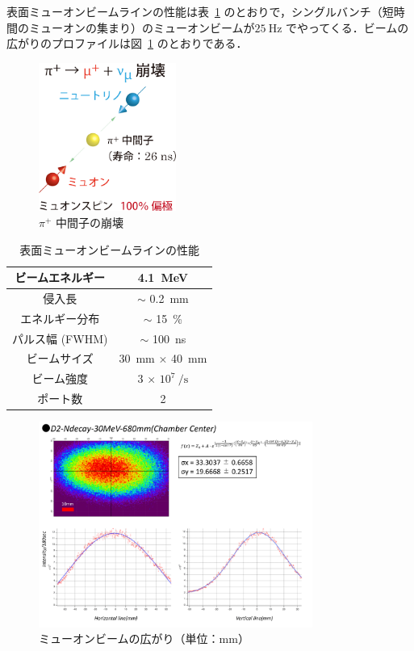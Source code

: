 表面ミューオンビームラインの性能は表~\ref{muon1} のとおりで，シングルバンチ（短時間のミューオンの集まり）のミューオンビームが$25~\mathrm{Hz}$ でやってくる．ビームの広がりのプロファイルは図~\ref{muon2} のとおりである．%

\begin{figure}[H]
\centering
\includegraphics[width=0.4\textwidth]{figure/hayakawa/decay_pion.png}
\caption{$\pi^{+}$ 中間子の崩壊\cite{aboutmuon}}
\end{figure}

\begin{table}[H]
\caption{表面ミューオンビームラインの性能}
\label{muon1}
\centering
\begin{tabular}{cc}\toprule
ビームエネルギー & 4.1~MeV \\ \midrule
侵入長 & $\sim$ 0.2~mm \\ \midrule
エネルギー分布 & $\sim$ 15~\% \\ \midrule
パルス幅 (FWHM) & $\sim$ 100~ns \\ \midrule
ビームサイズ & 30~mm $\times$ 40~mm \\ \midrule
ビーム強度 & 3 $\times$ $10^7~/\mathrm{s}$ \\ \midrule
ポート数 & 2 \\ \bottomrule
\end{tabular}
\end{table}
   
\begin{figure}[H]
\centering
\includegraphics[width=0.8\textwidth]{figure/hayakawa/profile.pdf}
\caption{ミューオンビームの広がり（単位：$\mathrm{mm}$）}
\label{muon2}
\end{figure}


